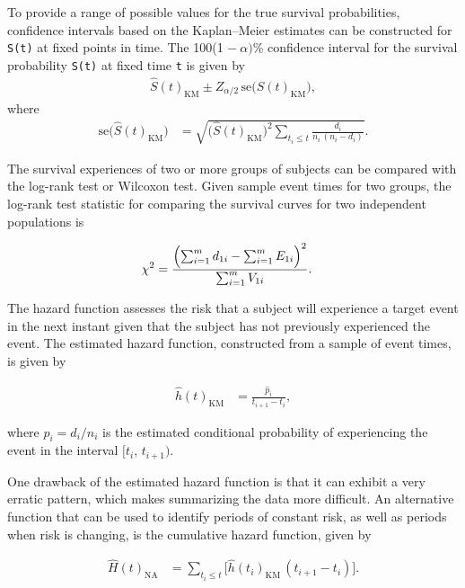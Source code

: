 \documentclass[
]{report}
\begin{document}
To provide a range of possible values for the true survival probabilities, confidence intervals based on the Kaplan--Meier estimates can be constructed for \texttt{S(t)} at fixed points in time. The 100(1 \(\scriptstyle -\  \alpha)\)\% confidence interval for the survival probability \texttt{S(t)} at fixed time \texttt{t} is given by
\begin{align}
\hat S(t)_{\mathrm{KM}} \pm Z_{\alpha/2}\,\mathrm{se}\bigl(\hat S(t)_{\mathrm{KM}}\bigr),
\end{align}
where
\begin{align}
\mathrm{se}\bigl(\hat S(t)_{\mathrm{KM}}\bigr)
&= \sqrt{
\bigl(\hat S(t)_{\mathrm{KM}}\bigr)^2 
\sum_{t_i \le t} \frac{d_i}{n_i\,(n_i - d_i)}
}.
\end{align}

The survival experiences of two or more groups of subjects can be compared with the log-rank test or Wilcoxon test. Given sample event times for two groups, the log-rank test statistic for comparing the survival curves for two independent populations is

\begin{align}
\chi^2 &= \frac{\Bigl(\sum_{i=1}^m d_{1i} - \sum_{i=1}^m E_{1i}\Bigr)^2}
{\sum_{i=1}^m V_{1i}}.
\end{align}

The hazard function assesses the risk that a subject will experience a target event in the next instant given that the subject has not previously experienced the event. The estimated hazard function, constructed from a sample of event times, is given by

\begin{align}
\hat h(t)_{\mathrm{KM}} &= \frac{\hat p_i}{t_{i+1} - t_i},
\end{align}

where \(\scriptstyle \hat p_i = d_i / n_i\) is the estimated conditional probability of experiencing the event in the interval \(\scriptstyle [t_i,\,t_{i+1})\).

One drawback of the estimated hazard function is that it can exhibit a very erratic pattern, which makes summarizing the data more difficult. An alternative function that can be used to identify periods of constant risk, as well as periods when risk is changing, is the cumulative hazard function, given by

\begin{align}
\widehat H(t)_{\mathrm{NA}}
&= \sum_{t_i \le t}
\bigl[\hat h(t_i)_{\mathrm{KM}}\,(t_{i+1} - t_i)\bigr].
\end{align}
\end{document}
